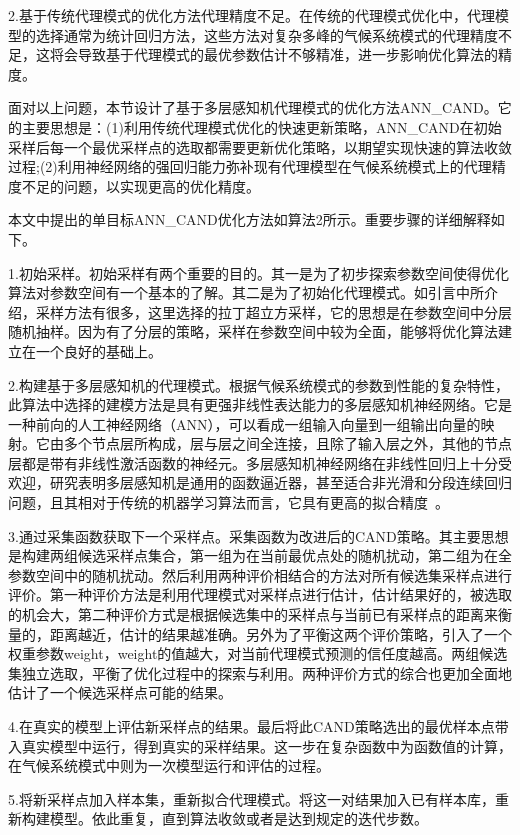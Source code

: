 2.基于传统代理模式的优化方法代理精度不足。在传统的代理模式优化中，代理模型的选择通常为统计回归方法，这些方法对复杂多峰的气候系统模式的代理精度不足，这将会导致基于代理模式的最优参数估计不够精准，进一步影响优化算法的精度。

面对以上问题，本节设计了基于多层感知机代理模式的优化方法ANN\_CAND。它的主要思想是：(1)利用传统代理模式优化的快速更新策略，ANN\_CAND在初始采样后每一个最优采样点的选取都需要更新优化策略，以期望实现快速的算法收敛过程;(2)利用神经网络的强回归能力弥补现有代理模型在气候系统模式上的代理精度不足的问题，以实现更高的优化精度。

本文中提出的单目标ANN\_CAND优化方法如算法2所示。重要步骤的详细解释如下。

1.初始采样。初始采样有两个重要的目的。其一是为了初步探索参数空间使得优化算法对参数空间有一个基本的了解。其二是为了初始化代理模式。如引言中所介绍，采样方法有很多，这里选择的拉丁超立方采样，它的思想是在参数空间中分层随机抽样。因为有了分层的策略，采样在参数空间中较为全面，能够将优化算法建立在一个良好的基础上。

2.构建基于多层感知机的代理模式。根据气候系统模式的参数到性能的复杂特性，此算法中选择的建模方法是具有更强非线性表达能力的多层感知机神经网络。它是一种前向的人工神经网络（ANN），可以看成一组输入向量到一组输出向量的映射。它由多个节点层所构成，层与层之间全连接，且除了输入层之外，其他的节点层都是带有非线性激活函数的神经元。多层感知机神经网络在非线性回归上十分受欢迎，研究表明多层感知机是通用的函数逼近器，甚至适合非光滑和分段连续回归问题，且其相对于传统的机器学习算法而言，它具有更高的拟合精度~\cite{selmic2002neural}。

3.通过采集函数获取下一个采样点。采集函数为改进后的CAND策略。其主要思想是构建两组候选采样点集合，第一组为在当前最优点处的随机扰动，第二组为在全参数空间中的随机扰动。然后利用两种评价相结合的方法对所有候选集采样点进行评价。第一种评价方法是利用代理模式对采样点进行估计，估计结果好的，被选取的机会大，第二种评价方式是根据候选集中的采样点与当前已有采样点的距离来衡量的，距离越近，估计的结果越准确。另外为了平衡这两个评价策略，引入了一个权重参数weight，weight的值越大，对当前代理模式预测的信任度越高。两组候选集独立选取，平衡了优化过程中的探索与利用。两种评价方式的综合也更加全面地估计了一个候选采样点可能的结果。

4.在真实的模型上评估新采样点的结果。最后将此CAND策略选出的最优样本点带入真实模型中运行，得到真实的采样结果。这一步在复杂函数中为函数值的计算，在气候系统模式中则为一次模型运行和评估的过程。

5.将新采样点加入样本集，重新拟合代理模式。将这一对结果加入已有样本库，重新构建模型。依此重复，直到算法收敛或者是达到规定的迭代步数。

